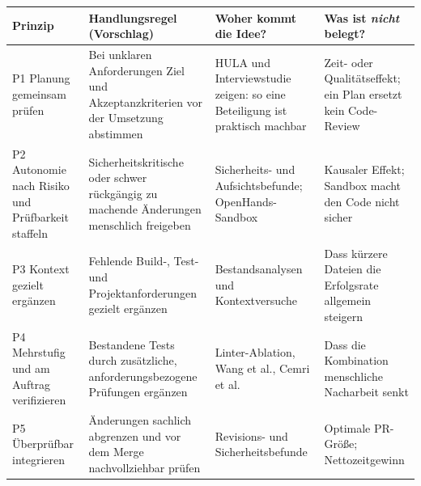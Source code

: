 \documentclass[11pt,a4paper,parskip=half]{scrartcl}
\begin{document}
\begin{center}
\end{center}

\begin{center}\small
\begin{tabularx}{\textwidth}{@{}p{2.6cm}LLL@{}}
\toprule
\textbf{Prinzip} & \textbf{Handlungsregel (Vorschlag)} & \textbf{Woher kommt die Idee?} & \textbf{Was ist \emph{nicht} belegt?} \\
\midrule
P1 Planung gemeinsam prüfen & Bei unklaren Anforderungen Ziel und Akzeptanzkriterien vor der Umsetzung abstimmen & HULA und Interviewstudie zeigen: so eine Beteiligung ist praktisch machbar & Zeit- oder Qualitätseffekt; ein Plan ersetzt kein Code-Review \\
P2 Autonomie nach Risiko und Prüfbarkeit staffeln & Sicherheitskritische oder schwer rückgängig zu machende Änderungen menschlich freigeben & Sicherheits- und Aufsichtsbefunde; OpenHands-Sandbox & Kausaler Effekt; Sandbox macht den Code nicht sicher \\
P3 Kontext gezielt ergänzen & Fehlende Build-, Test- und Projektanforderungen gezielt ergänzen & Bestandsanalysen und Kontextversuche & Dass kürzere Dateien die Erfolgsrate allgemein steigern \\
P4 Mehrstufig und am Auftrag verifizieren & Bestandene Tests durch zusätzliche, anforderungsbezogene Prüfungen ergänzen & Linter-Ablation, Wang et al., Cemri et al. & Dass die Kombination menschliche Nacharbeit senkt \\
P5 Überprüfbar integrieren & Änderungen sachlich abgrenzen und vor dem Merge nachvollziehbar prüfen & Revisions- und Sicherheitsbefunde & Optimale PR-Größe; Nettozeitgewinn \\
\bottomrule
\end{tabularx}
\end{center}
\end{document}
